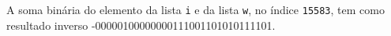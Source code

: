 \documentclass[12pt,varwidth=16cm,border=1pt]{standalone}
\begin{document}
A soma binária do elemento da lista \verb+i+ e da lista \verb+w+, no índice \verb+15583+, tem como resultado inverso -00000100000000111001101010111101.

\questiomfalse
\end{document}
